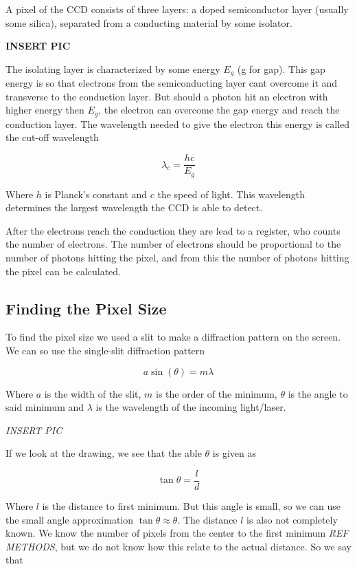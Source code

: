 \documentclass{emulateapj}
\begin{document}
A pixel of the CCD consists of three layers: a doped semiconductor layer (usually some silica), separated from a conducting material by some isolator. 

\textbf{INSERT PIC}


The isolating layer is characterized by some energy $E_g$ (g for gap). This gap energy is so that electrons from the semiconducting layer cant overcome it and transverse to the conduction layer. But should a photon hit an electron with higher energy then $E_g$, the electron can overcome the gap energy and reach the conduction layer. The wavelength needed to give the electron this energy is called the cut-off wavelength

\begin{equation}
\lambda_{c} = \frac{hc}{E_g}
\end{equation}

Where $h$ is Planck's constant and $c$ the speed of light. This wavelength determines the largest wavelength the CCD is able to detect. 

After the electrons reach the conduction they are lead to a register, who counts the number of electrons. The number of electrons should be proportional to the number of photons hitting the pixel, and from this the number of photons hitting the pixel can be calculated.


\subsection{Finding the Pixel Size}
\label{sec:pixSize}
To find the pixel size we used a slit to make a diffraction pattern on the screen. We can so use the single-slit diffraction pattern

\begin{equation}
a \sin(\theta) = m\lambda
\label{eq:diffPatt}
\end{equation}

Where $a$ is the width of the slit, $m$ is the order of the minimum, $\theta$ is the angle to said minimum and $\lambda$ is the wavelength of the incoming light/laser.

\emph{INSERT PIC}

If we look at the drawing, we see that the able $\theta$ is given as

\begin{equation}
\tan \theta = \frac{l}{d}
\end{equation}

Where $l$ is the distance to first minimum. But this angle is small, so we can use the small angle approximation $\tan \theta \approx \theta$. The distance $l$ is also not completely known. We know the number of pixels from the center to the first minimum \emph{REF METHODS}, but we do not know how this relate to the actual distance. So we say that
\end{document}
